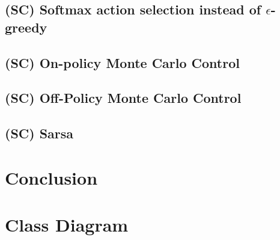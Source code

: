 \documentclass{article}
\begin{document}
\subsection{(SC) Softmax action selection instead of $\epsilon$-greedy}
\subsection{(SC) On-policy Monte Carlo Control}
\subsection{(SC) Off-Policy Monte Carlo Control}
\subsection{(SC) Sarsa}

\section{Conclusion}

\newpage
\nocite{*}



\newpage
\appendix
\appendixpage
\section{Class Diagram} \label{app:classDiagram}
\end{document}
